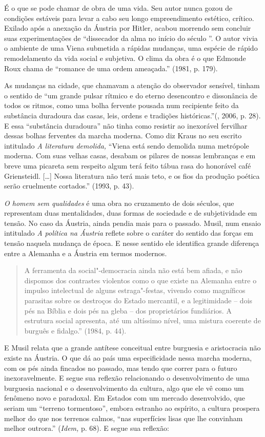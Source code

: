 É o que se pode chamar de obra de uma vida. Seu autor nunca gozou de
condições estáveis para levar a cabo seu longo empreendimento estético,
crítico. Exilado após a anexação da Áustria por Hitler, acabou morrendo
sem concluir suas experimentações de ``dissecador da alma no início do
século ''. O autor vivia o ambiente de uma Viena submetida a rápidas
mudanças, uma espécie de rápido remodelamento da vida social e
subjetiva. O clima da obra é o que Edmonde Roux chama de ``romance de
uma ordem ameaçada.'' (1981, p. 179).

As mudanças na cidade, que chamavam a atenção do observador sensível,
tinham o sentido de ``um grande pulsar rítmico e do eterno desencontro e
dissonância de todos os ritmos, como uma bolha fervente pousada num
recipiente feito da substância duradoura das casas, leis, ordens e
tradições históricas.''(, 2006, p. 28). E essa ``substância
duradoura'' não tinha como resistir ao inexorável fervilhar dessas
bolhas ferventes da marcha moderna. Como diz Kraus no seu escrito
intitulado \emph{A literatura demolida,} ``Viena está sendo demolida
numa metrópole moderna. Com suas velhas casas, desabam os pilares de
nossas lembranças e em breve uma picareta sem respeito algum terá feito
tábua rasa do honorável café Griensteidl. [\ldots{}] Nossa
literatura não terá mais teto, e os fios da produção poética serão
cruelmente cortados.'' (1993, p. 43).

\emph{O homem sem qualidades} é uma obra no cruzamento de dois séculos,
que representam duas mentalidades, duas formas de sociedade e de
subjetividade em tensão. No caso da Áustria, ainda pendia
mais para o passado. Musil, num ensaio intitulado \emph{A política na
Áustria} reflete sobre o caráter do sentido das forças em tensão naquela
mudança de época. E nesse sentido ele identifica grande diferença entre
a Alemanha e a Áustria em termos modernos.

\begin{quote}
A ferramenta da social"-democracia ainda não está bem afiada, e não
dispomos dos contrastes violentos como o que existe na Alemanha entre o
impulso intelectual de alguns estraga"-festas, vivendo como magníficos
parasitas sobre os destroços do Estado mercantil, e a legitimidade --
dois pés na Bíblia e dois pés na gleba -- dos proprietários fundiários.
A estrutura social apresenta, até um altíssimo nível, uma mistura
coerente de burguês e fidalgo.'' (1984, p. 44).
\end{quote}

E Musil relata que a grande antítese conceitual entre burguesia e
aristocracia não existe na Áustria. O que dá ao país uma especificidade
nessa marcha moderna, com os pés ainda fincados no passado, mas tendo
que correr para o futuro inexoravelmente. E segue sua reflexão
relacionando o desenvolvimento de uma burguesia nacional e o
desenvolvimento da cultura, algo que ele vê como um fenômeno novo e
paradoxal. Em Estados com um mercado desenvolvido, que seriam um
``terreno tormentoso'', embora estranho ao espírito, a cultura prospera
melhor do que nos terrenos calmos, ``nas superfícies lisas que lhe
convinham melhor outrora.'' (\emph{Idem,} p. 68). E segue sua reflexão:

